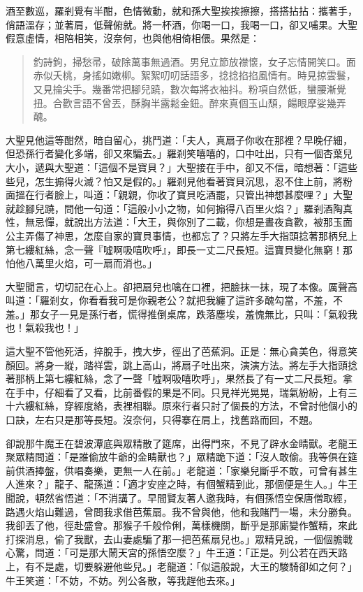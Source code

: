 酒至數巡，羅剎覺有半酣，色情微動，就和孫大聖挨挨擦擦，搭搭拈拈：攜著手，俏語溫存；並著肩，低聲俯就。將一杯酒，你喝一口，我喝一口，卻又哺果。大聖假意虛情，相陪相笑，沒奈何，也與他相倚相偎。果然是：
\begin{quote}
釣詩鉤，掃愁帚，破除萬事無過酒。男兒立節放襟懷，女子忘情開笑口。面赤似夭桃，身搖如嫩柳。絮絮叨叨話語多，捻捻掐掐風情有。時見掠雲鬟，又見掄尖手。幾番常把腳兒蹺，數次每將衣袖抖。粉項自然低，蠻腰漸覺扭。合歡言語不曾丟，酥胸半露鬆金鈕。醉來真個玉山頹，餳眼摩娑幾弄醜。
\end{quote}

大聖見他這等酣然，暗自留心，挑鬥道：「夫人，真扇子你收在那裡？早晚仔細，但恐孫行者變化多端，卻又來騙去。」羅剎笑嘻嘻的，口中吐出，只有一個杏葉兒大小，遞與大聖道：「這個不是寶貝？」大聖接在手中，卻又不信，暗想著：「這些些兒，怎生搧得火滅？怕又是假的。」羅剎見他看著寶貝沉思，忍不住上前，將粉面搵在行者臉上，叫道：「親親，你收了寶貝吃酒罷，只管出神想甚麼哩？」大聖就趁腳兒蹺，問他一句道：「這般小小之物，如何搧得八百里火焰？」羅剎酒陶真性，無忌憚，就說出方法道：「大王，與你別了二載，你想是晝夜貪歡，被那玉面公主弄傷了神思，怎麼自家的寶貝事情，也都忘了？只將左手大指頭捻著那柄兒上第七縷紅絲，念一聲『噓啊吸嘻吹呼』，即長一丈二尺長短。這寶貝變化無窮！那怕他八萬里火焰，可一扇而消也。」

大聖聞言，切切記在心上。卻把扇兒也噙在口裡，把臉抹一抹，現了本像。厲聲高叫道：「羅剎女，你看看我可是你親老公？就把我纏了這許多醜勾當，不羞，不羞。」那女子一見是孫行者，慌得推倒桌席，跌落塵埃，羞愧無比，只叫：「氣殺我也！氣殺我也！」

這大聖不管他死活，捽脫手，拽大步，徑出了芭蕉洞。正是：無心貪美色，得意笑顏回。將身一縱，踏祥雲，跳上高山，將扇子吐出來，演演方法。將左手大指頭捻著那柄上第七縷紅絲，念了一聲「噓啊吸嘻吹呼」，果然長了有一丈二尺長短。拿在手中，仔細看了又看，比前番假的果是不同。只見祥光晃晃，瑞氣紛紛，上有三十六縷紅絲，穿經度絡，表裡相聯。原來行者只討了個長的方法，不曾討他個小的口訣，左右只是那等長短。沒奈何，只得搴在肩上，找舊路而回，不題。

卻說那牛魔王在碧波潭底與眾精散了筵席，出得門來，不見了辟水金睛獸。老龍王聚眾精問道：「是誰偷放牛爺的金睛獸也？」眾精跪下道：「沒人敢偷。我等俱在筵前供酒捧盤，供唱奏樂，更無一人在前。」老龍道：「家樂兒斷乎不敢，可曾有甚生人進來？」龍子、龍孫道：「適才安座之時，有個蟹精到此，那個便是生人。」牛王聞說，頓然省悟道：「不消講了。早間賢友著人邀我時，有個孫悟空保唐僧取經，路遇火焰山難過，曾問我求借芭蕉扇。我不曾與他，他和我賭鬥一場，未分勝負。我卻丟了他，徑赴盛會。那猴子千般伶俐，萬樣機關，斷乎是那廝變作蟹精，來此打探消息，偷了我獸，去山妻處騙了那一把芭蕉扇兒也。」眾精見說，一個個膽戰心驚，問道：「可是那大鬧天宮的孫悟空麼？」牛王道：「正是。列公若在西天路上，有不是處，切要躲避他些兒。」老龍道：「似這般說，大王的駿騎卻如之何？」牛王笑道：「不妨，不妨。列公各散，等我趕他去來。」

